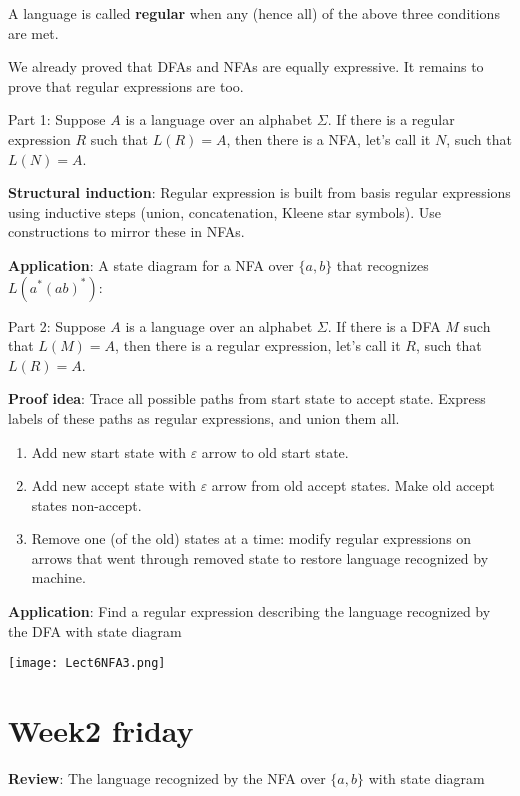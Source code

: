 \documentclass[12pt, oneside]{article}
\begin{document}
A language is called {\bf regular} when any (hence all) of the above three conditions are met.

We already proved that DFAs and NFAs are equally expressive. It remains to prove that regular expressions 
are too.

Part 1: Suppose $A$ is a language over an alphabet $\Sigma$.
If there is a regular expression $R$ such that $L(R) = A$, then there is a NFA, let's call it $N$, such that 
$L(N) = A$.

{\bf Structural induction}: Regular expression is built from basis regular expressions using inductive steps
(union, concatenation, Kleene star symbols). Use constructions to mirror these in NFAs.


{\bf Application}: A state diagram for a NFA over $\{a,b\}$ that recognizes $L(a^* (ab)^*)$:

\vfill

Part 2: Suppose $A$ is a language over an alphabet $\Sigma$.
If there is a DFA $M$ such that $L(M) = A$, then there is a regular expression, let's call it $R$, such that 
$L(R) = A$.

{\bf Proof idea}: Trace all possible paths from start state to accept state.  Express labels of these paths
as regular expressions, and union them all.

\begin{enumerate}
\item Add new start state with $\varepsilon$ arrow to old start state.
\item Add new accept state with $\varepsilon$ arrow from old accept states.  Make old accept states
non-accept.
\item Remove one (of the old) states at a time: modify regular expressions on arrows that went through removed
state to restore language recognized by machine.
\end{enumerate}

{\bf Application}: Find a regular expression describing the language recognized by the DFA with 
state diagram

\texttt{[image: Lect6NFA3.png]}

\vfill
 \vfill
\section*{Week2 friday}


{\bf Review}: The language recognized by the NFA over $\{a,b\}$ with state diagram
\end{document}

